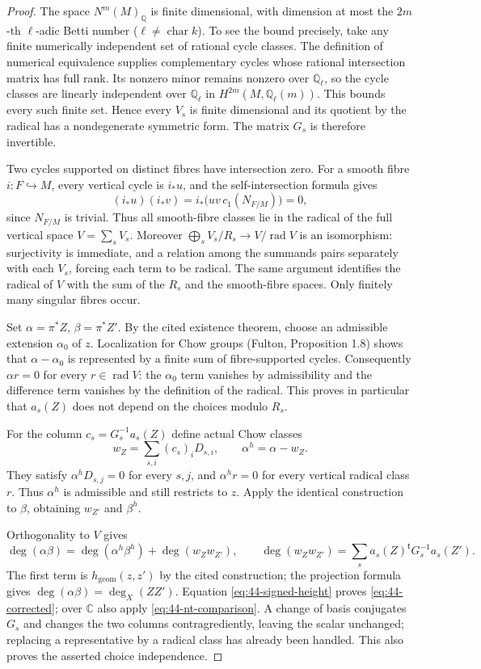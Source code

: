 \documentclass[11pt,a4paper]{article}
\theoremstyle{definition}
\theoremstyle{remark}
\begin{document}
\begin{proof}
The space $N^m(M)_{\mathbb Q}$ is finite dimensional, with dimension
at most the $2m$-th $\ell$-adic Betti number
($\ell\ne\operatorname{char}k$).  To see the bound precisely, take
any finite numerically independent set of rational cycle classes.
The definition of numerical equivalence supplies complementary
cycles whose rational intersection matrix has full rank.  Its
nonzero minor remains nonzero over $\mathbb Q_\ell$, so the cycle
classes are linearly independent over $\mathbb Q_\ell$ in
$H^{2m}(M,\mathbb Q_\ell(m))$.  This bounds every such finite set.
Hence every $V_s$ is finite dimensional and its quotient by the
radical has a nondegenerate symmetric form.
The matrix $G_s$ is therefore invertible.

Two cycles supported on distinct fibres have intersection zero.
For a smooth fibre $i:F\hookrightarrow M$, every vertical cycle is
$i_*u$, and the self-intersection formula gives
\[
 (i_*u)(i_*v)=i_*\bigl(uv\,c_1(N_{F/M})\bigr)=0,
\]
since $N_{F/M}$ is trivial.  Thus all smooth-fibre classes lie in the
radical of the full vertical space $V=\sum_sV_s$.  Moreover
$\bigoplus_s V_s/R_s\to V/\operatorname{rad}V$ is an isomorphism:
surjectivity is immediate, and a relation among the summands pairs
separately with each $V_s$, forcing each term to be radical.  The same
argument identifies the radical of $V$ with the sum of the $R_s$ and
the smooth-fibre spaces.  Only finitely many singular fibres occur.

Set $\alpha=\pi^*Z$, $\beta=\pi^*Z'$.  By the cited existence theorem,
choose an admissible extension $\alpha_0$ of $z$.  Localization for Chow
groups (Fulton, Proposition 1.8) shows that
$\alpha-\alpha_0$ is represented by a finite sum of fibre-supported
cycles.  Consequently $\alpha r=0$ for every $r\in\operatorname{rad}V$:
the $\alpha_0$ term vanishes by admissibility and the difference term
vanishes by the definition of the radical.  This proves in particular
that $a_s(Z)$ does not depend on the choices modulo $R_s$.

For the column $c_s=G_s^{-1}a_s(Z)$ define actual Chow classes
\[
 w_Z=\sum_{s,i}(c_s)_iD_{s,i},\qquad
 \alpha^h=\alpha-w_Z.
\]
They satisfy $\alpha^h D_{s,j}=0$ for every $s,j$, and $\alpha^h r=0$
for every vertical radical class $r$.  Thus $\alpha^h$ is admissible
and still restricts to $z$.  Apply the identical construction to
$\beta$, obtaining $w_{Z'}$ and $\beta^h$.

Orthogonality to $V$ gives
\[
 \deg(\alpha\beta)=\deg(\alpha^h\beta^h)+\deg(w_Zw_{Z'}),\qquad
 \deg(w_Zw_{Z'})=\sum_s a_s(Z)^{\mathsf t}G_s^{-1}a_s(Z').
\]
The first term is $h_{\mathrm{geom}}(z,z')$ by the cited construction;
the projection formula gives $\deg(\alpha\beta)=\deg_X(ZZ')$.
Equation \eqref{eq:44-signed-height} proves
\eqref{eq:44-corrected}; over $\mathbb C$ also apply
\eqref{eq:44-nt-comparison}.  A change of basis conjugates $G_s$
and changes the two columns contragrediently, leaving the scalar
unchanged; replacing a representative by a radical class has already
been handled.  This also proves the asserted choice independence.
\end{proof}
\end{document}
